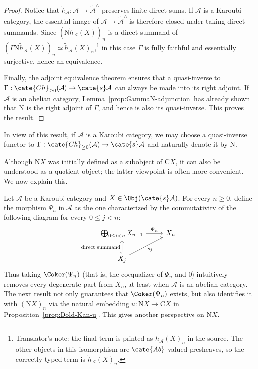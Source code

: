 \begin{proof}
	Notice that
	$\tilde{h}_{\mathcal{A}}:\mathcal{A}\to\tilde{\mathcal{A}}^\wedge$
	preserves finite direct sums. If $\mathcal{A}$ is a Karoubi category, the
	essential image of $\mathcal{A}\to\tilde{\mathcal{A}}^\wedge$ is
	therefore closed under taking direct summands. Since
	$(\mathrm{N}\tilde{h}_{\mathcal{A}}(X))_n$ is a direct summand of
	$(\Gamma\mathrm{N}\tilde{h}_{\mathcal{A}}(X))_n\simeq
	\tilde{h}_{\mathcal{A}}(X)_n$,\footnote{Translator's note: the final term
	is printed as $h_{\mathcal{A}}(X)_n$ in the source. The other objects in
	this isomorphism are $\cate{Ab}$-valued presheaves, so the correctly typed
	term is $\tilde{h}_{\mathcal{A}}(X)_n$.} in this case $\Gamma$ is fully
	faithful and essentially surjective, hence an equivalence.

	Finally, the adjoint equivalence theorem
	\cite[Theorem 2.6.12]{Li1} ensures that a quasi-inverse to
	$\Gamma:\cate{Ch}_{\geq0}(\mathcal{A})\to\cate{s}\mathcal{A}$ can always
	be made into its right adjoint. If $\mathcal{A}$ is an abelian category,
	Lemma~\ref{prop:GammaN-adjunction} has already shown that $\mathrm{N}$ is
	the right adjoint of $\Gamma$, and hence is also its quasi-inverse. This
	proves the result.
\end{proof}

\begin{convention}
	In view of this result, if $\mathcal{A}$ is a Karoubi category, we may
	choose a quasi-inverse functor to
	$\Gamma:\cate{Ch}_{\geq0}(\mathcal{A})\to\cate{s}\mathcal{A}$ and
	naturally denote it by $\mathrm{N}$.
\end{convention}

Although $\mathrm{N}X$ was initially defined as a subobject of
$\mathrm{C}X$, it can also be understood as a quotient object; the latter
viewpoint is often more convenient. We now explain this.

Let $\mathcal{A}$ be a Karoubi category and
$X\in\Obj(\cate{s}\mathcal{A})$. For every $n\geq0$, define the morphism
$\Psi_n$ in $\mathcal{A}$ as the one characterized by the commutativity of
the following diagram for every $0\leq j<n$:
\[\begin{tikzcd}
	\bigoplus_{0 \leq i < n} X_{n-1} \arrow[r, "\Psi_n"] & X_n \\
	X_j \arrow[hookrightarrow, u, "\text{direct summand}"] \arrow[ru, "{s_j}"'] &
\end{tikzcd}\]
Thus taking $\Coker(\Psi_n)$ (that is, the coequalizer of $\Psi_n$ and $0$)
intuitively removes every degenerate part from $X_n$, at least when
$\mathcal{A}$ is an abelian category. The next result not only guarantees
that $\Coker(\Psi_n)$ exists, but also identifies it with
$(\mathrm{N}X)_n$ via the natural embedding
$u:\mathrm{N}X\to\mathrm{C}X$ in Proposition~\ref{prop:Dold-Kan-u}. This
gives another perspective on $\mathrm{N}X$.

